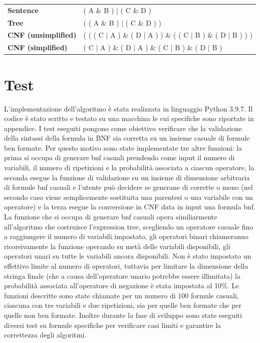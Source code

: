 \documentclass{article} %
\begin{document}
\vspace{0.5cm}

\begin{tabular}{|p{3cm}|p{7cm}|}
    \footnotesize \textbf{Sentence} & \footnotesize ( A \& B ) $|$ ( C \& D ) \\
    \footnotesize \textbf{Tree} & \footnotesize ( ( A \& B ) $|$ ( C \& D ) ) \\
    \footnotesize \textbf{CNF (unsimplified)} & \footnotesize ( ( ( C $|$ A ) \& ( D $|$ A ) ) \& ( ( C $|$ B ) \& ( D $|$ B ) ) ) \\
    \footnotesize \textbf{CNF (simplified)} & \footnotesize ( C $|$ A ) \& ( D $|$ A ) \& ( C $|$ B ) \& ( D $|$ B ) \\
\end{tabular}

\vspace{0.5cm}

\section*{Test} 

L'implementazione dell'algoritmo è stata realizzata in linguaggio Python 3.9.7. Il codice è stato scritto e testato su una macchina le cui specifiche sono riportate in appendice.
I test eseguiti pongono come obiettivo verificare che la validazione della sintassi della formula in BNF sia corretta su un insieme casuale di formule ben formate. Per questo motivo sono state implementate tre altre funzioni: la prima si occupa di generare bnf casuali prendendo come input il numero di variabili, il numero di ripetizioni e la probabilità associata a ciascun operatore, la seconda esegue la funzione di validazione su un insieme di dimensione arbitraria di formule bnf casuali e l'utente può decidere se generane di corrette o meno (nel secondo caso viene semplicemente sostituita una parentesi o una variabile con un operatore) e la terza esegue la conversione in CNF data in input una formula bnf.
La funzione che si occupa di generare bnf casuali opera similiarmente all'algoritmo che costruisce l'expression tree, scegliendo un operatore casuale fino a raggiungere il numero di variabili impostato, gli operatori binari chiameranno ricorsivamente la funzione operando su metà delle variabili disponibili, gli operatori unari su tutte le variabili ancora disponibili. Non è stato impostato un effettivo limite al numero di operatori, tuttavia per limitare la dimensione della stringa finale (che a causa dell'operatore unario potrebbe essere illimitata) la probabilità associata all'operatore di negazione è stata impostata al 10\%.
Le funzioni descritte sono state chiamate per un numero di 100 formule casuali, ciascuna con tre variabili e due ripetizioni, sia per quelle ben formate che per quelle non ben formate. Inoltre durante la fase di sviluppo sono state eseguiti diversi test su formule specifiche per verificare casi limiti e garantire la correttezza degli algoritmi.
\end{document}
